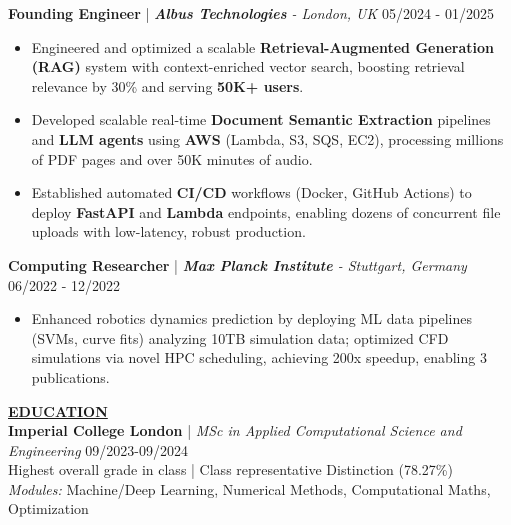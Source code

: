 \documentclass{article}
\newlength{\remaining}
\renewcommand{\section}[1]{
  \vspace{1.0em}\setlength{\remaining}{\textwidth-\widthof{\uppercase{#1}}}
    \noindent\underline{\fontsize{10}{15}\bfseries\uppercase{#1}\hspace*{\remaining}} \\
}
\renewcommand{\subsection}[3]{
    \noindent\textbf{#1} | \emph{#2} \hfill #3  
}
\begin{document}
    \subsection{Founding Engineer}{\textbf{Albus Technologies} - London, UK}{05/2024 - 01/2025}
    \begin{itemize}
        \item Engineered and optimized a scalable \textbf{Retrieval-Augmented Generation (RAG)} system with context-enriched vector search, boosting retrieval relevance by 30\% and serving \textbf{50K+ users}.
        \item Developed scalable real-time \textbf{Document Semantic Extraction} pipelines and \textbf{LLM agents} using \textbf{AWS} (Lambda, S3, SQS, EC2), processing millions of PDF pages and over 50K minutes of audio.
        \item Established automated \textbf{CI/CD} workflows (Docker, GitHub Actions) to deploy \textbf{FastAPI} and \textbf{Lambda} endpoints, enabling dozens of concurrent file uploads with low-latency, robust production.
    \end{itemize}
    

    \subsection{Computing Researcher}{\textbf{Max Planck Institute} - Stuttgart, Germany}{06/2022 - 12/2022}
    \begin{itemize}
        \item Enhanced robotics dynamics prediction by deploying ML data pipelines (SVMs, curve fits) analyzing 10TB simulation data; optimized CFD simulations via novel HPC scheduling, achieving 200x speedup, enabling 3 publications.
    \end{itemize}

    
    \section{Education}
    \subsection{Imperial College London}{MSc in Applied Computational Science and Engineering}{09/2023-09/2024} \\
    Highest overall grade in class | Class representative  \hfill Distinction (78.27\%) \\
    \textit{Modules:} Machine/Deep Learning, Numerical Methods, Computational Maths, Optimization
    
\end{document}
